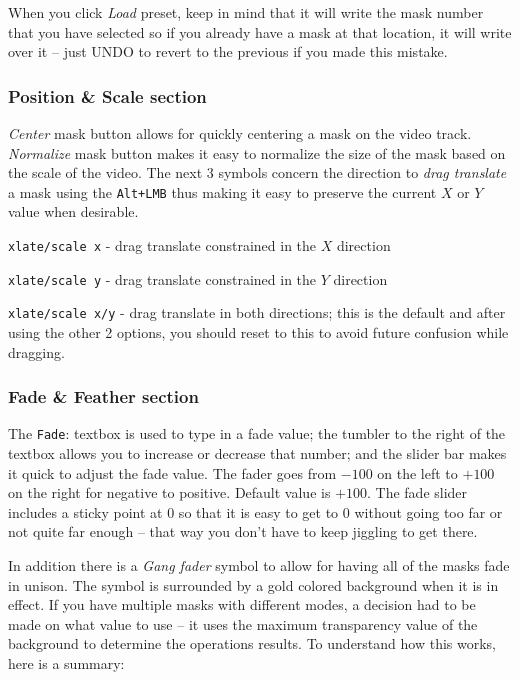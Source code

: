When you click \textit{Load} preset, keep in mind that it will write the mask number that you have selected so if you already have a mask at that location, it will write over it – just UNDO to revert to the previous if you made this mistake.

\subsubsection*{Position \& Scale section}%
\label{ssub:position_scale_section}

\textit{Center} mask button allows for quickly centering a mask on the video track. 
\textit{Normalize} mask button makes it easy to normalize the size of the mask based on the scale of the video. 
The next 3 symbols concern the direction to \textit{drag translate} a mask using the \texttt{Alt+LMB} thus making it easy to preserve the current $X$ or $Y$ value when desirable.

\texttt{xlate/scale x}	- drag translate constrained in the $X$ direction

\texttt{xlate/scale y}	- drag translate constrained in the $Y$ direction

\texttt{xlate/scale x/y}	- drag translate in both directions; this is the default and after using the other 2 options, you should reset to this to avoid future confusion while dragging.

\subsubsection*{Fade \& Feather section}%
\label{ssub:fade_feather_section}

The \texttt{Fade}: textbox is used to type in a fade value; the tumbler to the right of the textbox allows you to increase or decrease that number; and the slider bar makes it quick to adjust the fade value.  The fader goes from $-100$ on the left to $+100$ on the right for negative to positive.  Default value is $+100$. The fade slider includes a sticky point at 0 so that it is easy to get to 0 without going too far or not quite far enough -- that way you don’t have to keep jiggling to get there. 

In addition there is a \textit{Gang fader} symbol to allow for having all of the masks fade in unison. The symbol is surrounded by a gold colored background when it is in effect.  If you have multiple masks with different modes, a decision had to be made on what value to use -- it uses the maximum transparency value of the background to determine the operations results.  To understand how this works, here is a summary:

